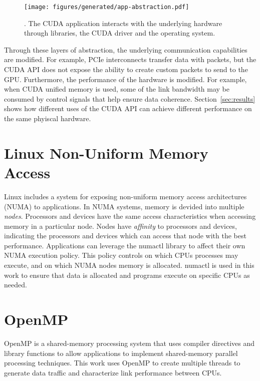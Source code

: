 \begin{figure}[ht]
    \centering
    \texttt{[image: figures/generated/app-abstraction.pdf]}
    \caption[]{. The CUDA application interacts with the underlying hardware through libraries, the CUDA driver and the operating system.}
    \label{fig:app-abstraction}
\end{figure}

Through these layers of abstraction, the underlying communication capabilities are modified.
For example, PCIe interconnects transfer data with packets, but the CUDA API does not expose the ability to create custom packets to send to the GPU.
Furthermore, the performance of the hardware is modified.
For example, when CUDA unified memory is used, some of the link bandwidth may be consumed by control signals that help ensure data coherence.
Section~\ref{sec:results} shows how different uses of the CUDA API can achieve different performance on the same phyiscal hardware.


\section{Linux Non-Uniform Memory Access}
\label{sec:numa}

Linux includes a system for exposing non-uniform memory access architectures (NUMA) to applications.
In NUMA systems, memory is devided into multiple \textit{nodes}\cite{numa2012}.
Processors and devices have the same access characteristics when accessing memory in a particular node.
Nodes have \textit{affinity} to processors and devices, indicating the processors and devices which can access that node with the best performance.
Applications can leverage the numactl\cite{wickman2015numactl} library to affect their own NUMA execution policy.
This policy controls on which CPUs processes may execute, and on which NUMA nodes memory is allocated.
numactl is used in this work to ensure that data is allocated and programs execute on specific CPUs as needed.

\section{OpenMP}
\label{sec:openmp}

OpenMP is a shared-memory processing system that uses compiler directives and library functions to allow applications to implement shared-memory parallel processing techniques.
This work uses OpenMP to create multiple threads to generate data traffic and characterize link performance between CPUs. 

